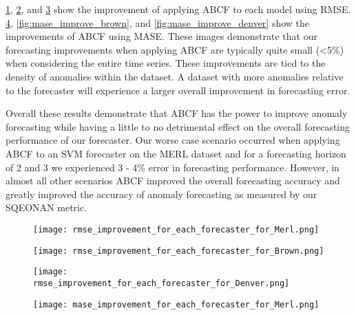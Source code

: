 \ref{fig:rmse_improve_merl}, \ref{fig:rmse_improve_brown}, and \ref{fig:rmse_improve_denver} show the improvement of applying ABCF to each model using RMSE. \ref{fig:mase_improve_merl}, \ref{fig:mase_improve_brown}, and \ref{fig:mase_improve_denver} show the improvements of ABCF using MASE.  These images demonstrate that our forecasting improvements when applying ABCF are typically quite small (<5\%) when considering the entire time series.  These improvements are tied to the density of anomalies within the dataset.  A dataset with more anomalies relative to the forecaster will experience a larger overall improvement in forecasting error.

Overall these results demonstrate that ABCF has the power to improve anomaly forecasting while having a little to no detrimental effect on the overall forecasting performance of our forecaster.  Our worse case scenario occurred when applying ABCF to an SVM forecaster on the MERL dataset and for a forecasting horizon of 2 and 3 we experienced 3 - 4\% error in forecasting performance.  However, in almost all other scenarios ABCF improved the overall forecasting accuracy and greatly improved the accuracy of anomaly forecasting as measured by our SQEONAN metric.

  
\begin{figure}[!h]
	\begin{center}
		\texttt{[image: rmse\_improvement\_for\_each\_forecaster\_for\_Merl.png]}
	\end{center}
	\caption{}
	\label{fig:rmse_improve_merl}
\end{figure}

\begin{figure}[!h]
	\begin{center}
		\texttt{[image: rmse\_improvement\_for\_each\_forecaster\_for\_Brown.png]}
	\end{center}
	\caption{}
	\label{fig:rmse_improve_brown}
\end{figure}

\begin{figure}[!h]
	\begin{center}
		\texttt{[image: rmse\_improvement\_for\_each\_forecaster\_for\_Denver.png]}
	\end{center}
	\caption{}
	\label{fig:rmse_improve_denver}
\end{figure}

\begin{figure}[!h]
	\begin{center}
		\texttt{[image: mase\_improvement\_for\_each\_forecaster\_for\_Merl.png]}
	\end{center}
	\caption{}
	\label{fig:mase_improve_merl}
\end{figure}

